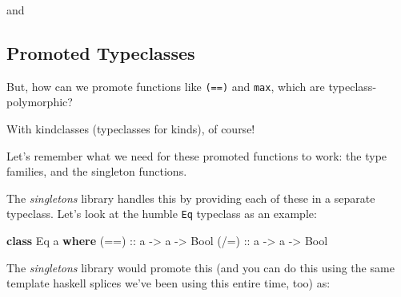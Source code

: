 \documentclass[]{article}
\newenvironment{Shaded}{}{}
\newcommand{\DataTypeTok}[1]{\textcolor[rgb]{0.56,0.13,0.00}{#1}}
\newcommand{\FunctionTok}[1]{\textcolor[rgb]{0.02,0.16,0.49}{#1}}
\newcommand{\KeywordTok}[1]{\textcolor[rgb]{0.00,0.44,0.13}{\textbf{#1}}}
\newcommand{\NormalTok}[1]{#1}
\newcommand{\OtherTok}[1]{\textcolor[rgb]{0.00,0.44,0.13}{#1}}
\begin{document}
and

\begin{Shaded}
\end{Shaded}

\hypertarget{promoted-typeclasses}{%
\subsection{Promoted Typeclasses}\label{promoted-typeclasses}}

But, how can we promote functions like \texttt{(==)} and \texttt{max}, which are
typeclass-polymorphic?

With kindclasses (typeclasses for kinds), of course!

Let's remember what we need for these promoted functions to work: the type
families, and the singleton functions.

The \emph{singletons} library handles this by providing each of these in a
separate typeclass. Let's look at the humble \texttt{Eq} typeclass as an
example:

\begin{Shaded}
\begin{Highlighting}[]
\KeywordTok{class} \DataTypeTok{Eq}\NormalTok{ a }\KeywordTok{where}
\OtherTok{    (==) ::}\NormalTok{ a }\OtherTok{->}\NormalTok{ a }\OtherTok{->} \DataTypeTok{Bool}
\OtherTok{    (/=) ::}\NormalTok{ a }\OtherTok{->}\NormalTok{ a }\OtherTok{->} \DataTypeTok{Bool}
\end{Highlighting}
\end{Shaded}

The \emph{singletons} library would promote this (and you can do this using the
same template haskell splices we've been using this entire time, too) as:
\end{document}
